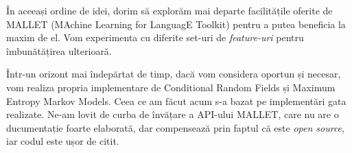 În aceeași ordine de idei, dorim să explorăm mai departe facilitățile oferite de MALLET (MAchine Learning for LanguagE Toolkit) pentru a putea beneficia la maxim de el. Vom experimenta cu diferite set-uri de \textit{feature-uri} pentru îmbunătățirea ulterioară.

Într-un orizont mai îndepărtat de timp, dacă vom considera oportun și necesar, vom realiza propria implementare de Conditional Random Fields și Maximum Entropy Markov Models. Ceea ce am făcut acum s-a bazat pe implementări gata realizate. Ne-am lovit de curba de învățare a API-ului MALLET, care nu are o ducumentație foarte elaborată, dar compensează prin faptul că este \textit{open source}, iar codul este ușor de citit.




